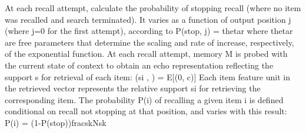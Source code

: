 {}At each recall attempt, calculate the probability of stopping recall (where no item was recalled and search terminated). It varies as a function of output position \markdownRendererDollarSign{}j\markdownRendererDollarSign{} (where \markdownRendererDollarSign{}j=0\markdownRendererDollarSign{} for the first attempt), according to\markdownRendererInterblockSeparator
{}\markdownRendererDollarSign{}\markdownRendererDollarSign{}P(stop, j) = \markdownRendererBackslash{}thetar\markdownRendererRightBrace{}\markdownRendererDollarSign{}\markdownRendererDollarSign{}\markdownRendererInterblockSeparator
{}where \markdownRendererDollarSign{}\markdownRendererBackslash{}thetar\markdownRendererDollarSign{} are free parameters that determine the scaling and rate of increase, respectively, of the exponential function.\markdownRendererInterblockSeparator
{}At each recall attempt, memory \markdownRendererDollarSign{}M\markdownRendererDollarSign{} is probed with the current state of context to obtain an echo representation reflecting the support \markdownRendererDollarSign{}s\markdownRendererDollarSign{} for retrieval of each item:\markdownRendererInterblockSeparator
{}\markdownRendererDollarSign{}\markdownRendererDollarSign{}(s\markdownRendererUnderscore{}i , \markdownRendererUnderscore{}) = E[(0, c)]\markdownRendererDollarSign{}\markdownRendererDollarSign{}\markdownRendererInterblockSeparator
{}Each item feature unit in the retrieved vector represents the relative support \markdownRendererDollarSign{}s\markdownRendererUnderscore{}i\markdownRendererDollarSign{} for retrieving the corresponding item. The probability \markdownRendererDollarSign{}P(i)\markdownRendererDollarSign{} of recalling a given item \markdownRendererDollarSign{}i\markdownRendererDollarSign{} is defined conditional on recall not stopping at that position, and varies with this result:\markdownRendererInterblockSeparator
{}\markdownRendererDollarSign{}\markdownRendererDollarSign{}P(i) = (1-P(stop))\markdownRendererBackslash{}frac\markdownRendererLeftBrace{}s\markdownRendererLeftBrace{}k\markdownRendererRightBrace{}\markdownRendererCircumflex{}\markdownRendererLeftBrace{}N\markdownRendererRightBrace{}s\markdownRendererUnderscore{}k\markdownRendererRightBrace{}\markdownRendererDollarSign{}\markdownRendererDollarSign{}\markdownRendererInterblockSeparator
